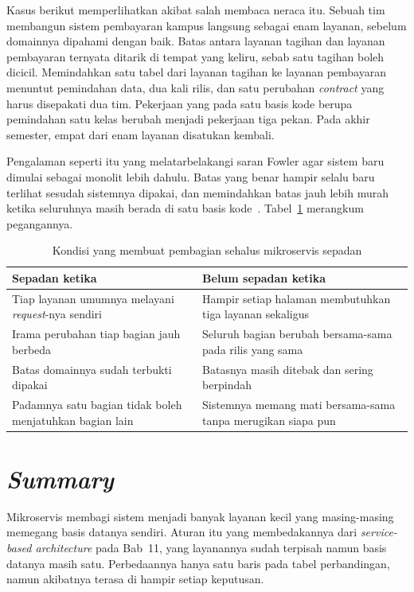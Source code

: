 Kasus berikut memperlihatkan akibat salah membaca neraca itu. Sebuah tim
membangun sistem pembayaran kampus langsung sebagai enam layanan, sebelum
domainnya dipahami dengan baik. Batas antara layanan tagihan dan layanan
pembayaran ternyata ditarik di tempat yang keliru, sebab satu tagihan boleh
dicicil. Memindahkan satu tabel dari layanan tagihan ke layanan pembayaran
menuntut pemindahan data, dua kali rilis, dan satu perubahan \textit{contract} yang harus
disepakati dua tim. Pekerjaan yang pada satu basis kode berupa pemindahan satu
kelas berubah menjadi pekerjaan tiga pekan. Pada akhir semester, empat dari enam
layanan disatukan kembali.

Pengalaman seperti itu yang melatarbelakangi saran Fowler agar sistem baru
dimulai sebagai monolit lebih dahulu. Batas yang benar hampir selalu baru
terlihat sesudah sistemnya dipakai, dan memindahkan batas jauh lebih murah
ketika seluruhnya masih berada di satu basis kode~\cite{fowler2015monolithfirst}.
Tabel~\ref{tab:sepadan} merangkum pegangannya.

\begin{table}[htbp]
  \centering
  \caption{Kondisi yang membuat pembagian sehalus mikroservis sepadan}
  \label{tab:sepadan}
  \begin{tabularx}{\textwidth}{|X|X|}
    \hline
    \textbf{Sepadan ketika} & \textbf{Belum sepadan ketika} \\
    \hline
    Tiap layanan umumnya melayani \textit{request}-nya sendiri & Hampir setiap halaman membutuhkan tiga layanan sekaligus \\
    \hline
    Irama perubahan tiap bagian jauh berbeda & Seluruh bagian berubah bersama-sama pada rilis yang sama \\
    \hline
    Batas domainnya sudah terbukti dipakai & Batasnya masih ditebak dan sering berpindah \\
    \hline
    Padamnya satu bagian tidak boleh menjatuhkan bagian lain & Sistemnya memang mati bersama-sama tanpa merugikan siapa pun \\
    \hline
  \end{tabularx}
\end{table}

\section{\textit{Summary}}

Mikroservis membagi sistem menjadi banyak layanan kecil yang masing-masing
memegang basis datanya sendiri. Aturan itu yang membedakannya dari
\textit{service-based architecture} pada Bab~11, yang layanannya sudah terpisah
namun basis datanya masih satu. Perbedaannya hanya satu baris pada tabel
perbandingan, namun akibatnya terasa di hampir setiap keputusan.

